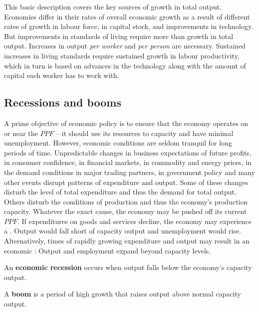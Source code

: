 This basic description covers the key sources of growth in total output.
Economies differ in their rates of overall economic growth as a result of
different rates of growth in labour force, in capital stock, and
improvements in technology. But improvements in standards of living require
more than growth in total output. Increases in output \textit{per worker}
and \textit{per person} are necessary. Sustained increases in living
standards require sustained growth in labour productivity, which in turn is
based on advances in the technology along with the amount of capital each
worker has to work with.

\newhtmlpage

\subsection*{Recessions and booms}

A prime objective of economic policy is to ensure that the economy operates
on or near the $PPF$ -- it should use its resources to capacity and have
minimal unemployment. However, economic conditions are seldom tranquil for
long periods of time. Unpredictable changes in business expectations of
future profits, in consumer confidence, in financial markets, in commodity
and energy prices, in the demand conditions in major trading partners, in
government policy and many other events disrupt patterns of expenditure and
output. Some of these changes disturb the level of total expenditure and
thus the demand for total output. Others disturb the conditions of
production and thus the economy's production capacity. Whatever the exact
cause, the economy may be pushed off its current $PPF$. If expenditures on
goods and services decline, the economy may experience a %
. Output would fall short of capacity output and
unemployment would rise. Alternatively, times of rapidly growing expenditure
and output may result in an economic : Output and
employment expand beyond capacity levels.

\begin{DefBox}
	An \textbf{economic recession} occurs when output falls below the economy's capacity output.
	
	A \textbf{boom} is a period of high growth that raises output above normal capacity output. 
\end{DefBox}

